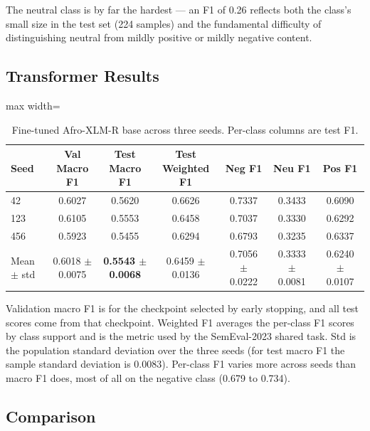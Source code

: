 The neutral class is by far the hardest --- an F1 of 0.26 reflects both the class's small size in the test set (224 samples) and the fundamental difficulty of distinguishing neutral from mildly positive or mildly negative content.

\subsection{Transformer Results}

\begin{table}[t]
\centering\small
\begin{adjustbox}{max width=\linewidth}
\begin{tabular}{lcccccc}
\toprule
Seed & Val Macro F1 & Test Macro F1 & Test Weighted F1 & Neg F1 & Neu F1 & Pos F1 \\
\midrule
42 & 0.6027 & 0.5620 & 0.6626 & 0.7337 & 0.3433 & 0.6090 \\
123 & 0.6105 & 0.5553 & 0.6458 & 0.7037 & 0.3330 & 0.6292 \\
456 & 0.5923 & 0.5455 & 0.6294 & 0.6793 & 0.3235 & 0.6337 \\
\midrule
Mean $\pm$ std & 0.6018 $\pm$ 0.0075 & \textbf{0.5543 $\pm$ 0.0068} & 0.6459 $\pm$ 0.0136 & 0.7056 $\pm$ 0.0222 & 0.3333 $\pm$ 0.0081 & 0.6240 $\pm$ 0.0107 \\
\bottomrule
\end{tabular}
\end{adjustbox}
\caption{Fine-tuned Afro-XLM-R base across three seeds. Per-class columns are test F1.}
\label{tab:seeds}
\end{table}

Validation macro F1 is for the checkpoint selected by early stopping, and all test scores come from that checkpoint. Weighted F1 averages the per-class F1 scores by class support and is the metric used by the SemEval-2023 shared task. Std is the population standard deviation over the three seeds (for test macro F1 the sample standard deviation is 0.0083). Per-class F1 varies more across seeds than macro F1 does, most of all on the negative class (0.679 to 0.734).

\subsection{Comparison}

